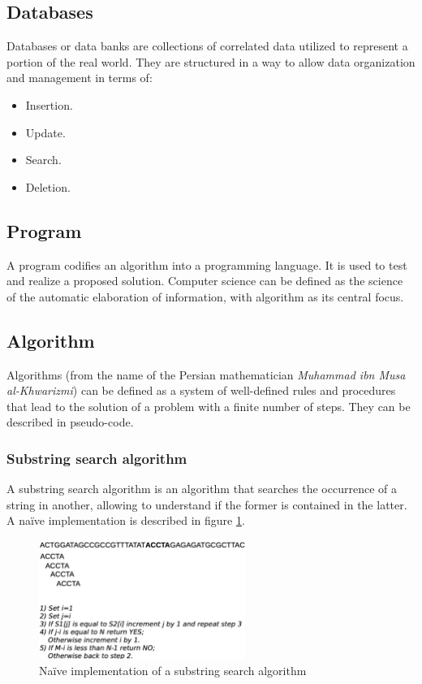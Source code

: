 	\subsection{Databases}
	Databases or data banks are collections of correlated data utilized to represent a portion of the real world.
	They are structured in a way to allow data organization and management in terms of:

	\begin{multicols}{4}
		\begin{itemize}
			\item Insertion.
			\item Update.
			\item Search.
			\item Deletion.
		\end{itemize}
	\end{multicols}

	\subsection{Program}
	A program codifies an algorithm into a programming language.
	It is used to test and realize a proposed solution.
	Computer science can be defined as the science of the automatic elaboration of information, with algorithm as its central focus.

	\subsection{Algorithm}
	Algorithms (from the name of the Persian mathematician \textit{Muhammad ibn Musa al-Khwarizmi}) can be defined as a system of well-defined rules and procedures that lead to the solution of a problem with a finite number of steps.
	They can be described in pseudo-code.

		\subsubsection{Substring search algorithm}
		A substring search algorithm is an algorithm that searches the occurrence of a string in another, allowing to understand if the former is contained in the latter.
		A na\"ive implementation is described in figure \ref{fig:substring-search-naive}.

		\begin{figure}[H]
			\centering
			\includegraphics[width=0.6\textwidth]{substring-search}
			\caption{Na\"ive implementation of a substring search algorithm}
			\label{fig:substring-search-naive}
		\end{figure}
